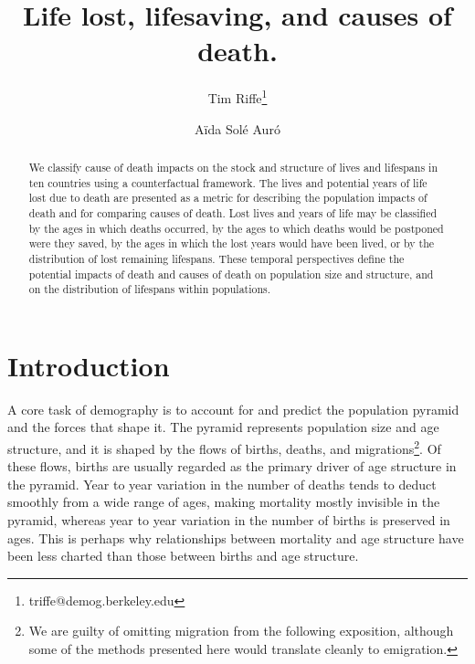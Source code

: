 \documentclass{article}
\begin{document}
\title{Life lost, lifesaving, and causes of death.}

\author[1]{Tim Riffe\thanks{triffe@demog.berkeley.edu}}
\author[2]{A{\"i}da Sol\'{e} Aur\'{o}}

\maketitle

%
\begin{abstract}
We classify cause of death impacts on the stock and structure of lives and
lifespans in ten countries using a counterfactual framework. The lives and potential years
of life lost due to death are presented as a metric for describing the population impacts of death and for comparing causes of
death. Lost lives and years of life may be classified by the ages in which
deaths occurred, by the ages to which deaths would be postponed were they saved, by the
ages in which the lost years would have been lived, or by the distribution of
lost remaining lifespans. These temporal perspectives define the
potential impacts of death and causes of death on population size and structure,
and on the distribution of lifespans within populations. 
\end{abstract}

%
\section*{Introduction}
A core task of demography is to account for and predict the population
pyramid and the forces that shape it. The pyramid represents population
size and age structure, and it is shaped by the flows of births,
deaths, and migrations\footnote{We are guilty of omitting migration from
the following exposition, although some of the methods presented here would
translate cleanly to emigration.}. Of these flows, births are usually regarded as the primary driver of age structure in the pyramid. Year to year variation in the
number of deaths tends to deduct smoothly from a wide range of ages,
making mortality mostly invisible in the pyramid, whereas year to year variation
in the number of births is preserved in ages. This is perhaps why 
relationships between mortality and age structure have been less charted than
those between births and age structure. 
\end{document}
